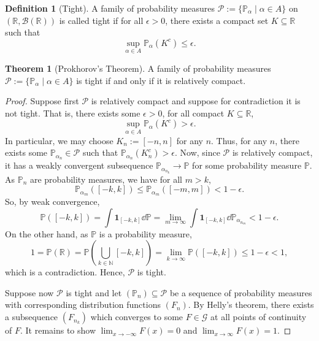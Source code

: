 \documentclass[]{article}
\theoremstyle{definition}
\newtheorem{theorem}{Theorem}
\theoremstyle{definition}
\newtheorem{definition}{Definition}[section]
\begin{document}
\begin{definition}[Tight]
  A family of probability measures \(\mathcal{P} := 
  \{\mathbb{P}_\alpha \mid \alpha \in A\}\) on \((\mathbb{R}, \mathcal{B}(\mathbb{R}))\) 
  is called tight if for all \(\epsilon > 0\), there exists a compact set 
  \(K \subseteq \mathbb{R}\) such that 
  \[\sup_{\alpha \in A} \mathbb{P}_\alpha(K^c) \le \epsilon.\]
\end{definition}

\begin{theorem}[Prokhorov's Theorem]
  A family of probability measures \(\mathcal{P} := \{\mathbb{P}_\alpha \mid \alpha \in A\}\) 
  is tight if and only if it is relatively compact.
\end{theorem}
\begin{proof}
  Suppose first \(\mathcal{P}\) is relatively compact and suppose for contradiction 
  it is not tight. That is, there exists some \(\epsilon > 0\), for all compact 
  \(K \subseteq \mathbb{R}\), 
  \[\sup_{\alpha \in A} \mathbb{P}_\alpha(K^c) > \epsilon.\]
  In particular, we may choose \(K_n := [-n, n]\) for any \(n\). Thus, 
  for any \(n\), there exists some \(\mathbb{P}_{\alpha_n} \in \mathcal{P}\) 
  such that \(\mathbb{P}_{\alpha_n}(K_n^c) > \epsilon\). Now, since \(\mathcal{P}\)
  is relatively compact, it has a weakly convergent subsequence 
  \(\mathbb{P}_{\alpha_{n_k}} \to \mathbb{P}\) for some probability measure 
  \(\mathbb{P}\). As \(\mathbb{P}_n\) are probability measures, we have 
  for all \(m > k\), 
  \[\mathbb{P}_{\alpha_m}([-k, k]) \le \mathbb{P}_{\alpha_m}([-m, m]) < 1 -\epsilon.\]
  So, by weak convergence, 
  \[\mathbb{P}([-k, k]) = \int \mathbf{1}_{[-k, k]} \dd \mathbb{P} = 
    \lim_{m \to \infty} \int \mathbf{1}_{[-k, k]} \dd \mathbb{P}_{\alpha_{n_m}}
    < 1 - \epsilon.\]
  On the other hand, as \(\mathbb{P}\) is a probability measure,
  \[1 = \mathbb{P}(\mathbb{R}) = 
    \mathbb{P}\left(\bigcup_{k \in \mathbb{N}} [-k, k]\right) = 
    \lim_{k \to \infty} \mathbb{P}([-k, k]) \le 1 - \epsilon < 1,\]
  which is a contradiction. Hence, \(\mathcal{P}\) is tight.

  Suppose now \(\mathcal{P}\) is tight and let \((\mathbb{P}_n) \subseteq \mathcal{P}\) 
  be a sequence of probability measures with corresponding distribution functions 
  \((F_n)\). By Helly's theorem, there exists a subsequence \((F_{n_k})\) which 
  converges to some \(F \in \mathcal{G}\) at all points of continuity of \(F\). 
  It remains to show \(\lim_{x \to - \infty} F(x) = 0\) and 
  \(\lim_{x \to \infty} F(x) = 1\).


\end{proof}
\end{document}
